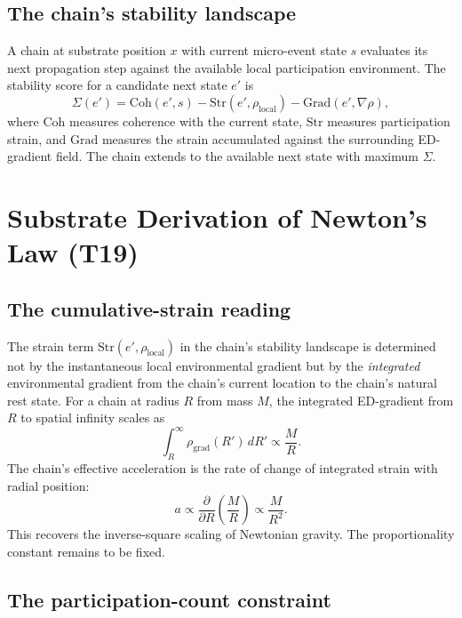 \documentclass[11pt,a4paper]{article}
\begin{document}
\subsection{The chain's stability landscape}

A chain at substrate position $x$ with current micro-event state $s$ evaluates its next propagation step against the available local participation environment. The stability score for a candidate next state $e'$ is
\begin{equation}
\Sigma(e') = \mathrm{Coh}(e', s) - \mathrm{Str}(e', \rho_{\mathrm{local}}) - \mathrm{Grad}(e', \nabla\rho),
\end{equation}
where $\mathrm{Coh}$ measures coherence with the current state, $\mathrm{Str}$ measures participation strain, and $\mathrm{Grad}$ measures the strain accumulated against the surrounding ED-gradient field. The chain extends to the available next state with maximum $\Sigma$.

\section{Substrate Derivation of Newton's Law (T19)}\label{sec:newton}

\subsection{The cumulative-strain reading}

The strain term $\mathrm{Str}(e', \rho_{\mathrm{local}})$ in the chain's stability landscape is determined not by the instantaneous local environmental gradient but by the \emph{integrated} environmental gradient from the chain's current location to the chain's natural rest state. For a chain at radius $R$ from mass $M$, the integrated ED-gradient from $R$ to spatial infinity scales as
\begin{equation}
\int_R^\infty \rho_{\mathrm{grad}}(R')\, dR' \propto \frac{M}{R}.
\end{equation}
The chain's effective acceleration is the rate of change of integrated strain with radial position:
\begin{equation}
a \propto \frac{\partial}{\partial R}\!\left(\frac{M}{R}\right) \propto \frac{M}{R^2}.
\end{equation}
This recovers the inverse-square scaling of Newtonian gravity. The proportionality constant remains to be fixed.

\subsection{The participation-count constraint}
\end{document}
